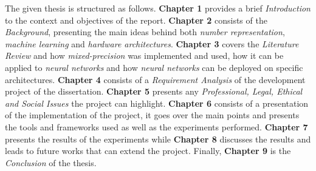 The given thesis is structured as follows. \textbf{Chapter 1} provides a brief \emph{Introduction} to the context and objectives of the report. \textbf{Chapter 2} consists of the \emph{Background}, presenting the main ideas behind both \emph{number representation}, \emph{machine learning} and \emph{hardware architectures}. \textbf{Chapter 3} covers the \emph{Literature Review} and how \emph{mixed-precision} was implemented and used, how it can be applied to \emph{neural networks} and how \emph{neural networks} can be deployed on specific architectures. \textbf{Chapter 4} consists of a \emph{Requirement Analysis} of the development project of the dissertation. \textbf{Chapter 5} presents any \emph{Professional, Legal, Ethical and Social Issues} the project can highlight. \textbf{Chapter 6} consists of a presentation of the implementation of the project, it goes over the main points and presents the tools and frameworks used as well as the experiments performed. \textbf{Chapter 7} presents the results of the experiments while \textbf{Chapter 8} discusses the results and leads to future works that can extend the project. Finally, \textbf{Chapter 9} is the \emph{Conclusion} of the thesis.
